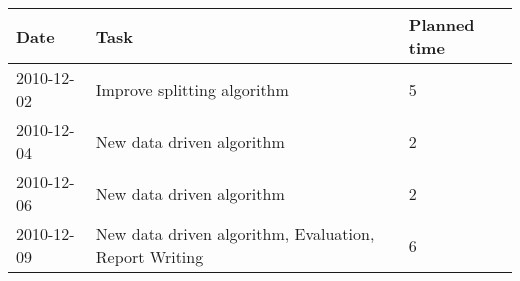 \documentclass[11pt, accentcolor=tud9b, nochapname]{tudexercise}
\begin{document}
\vspace{10pt}
\begin{tabular}{l | l | l}
  \hline
  \textbf{Date} & \textbf{Task} & \textbf{Planned time} \\ \hline
  2010-12-02 & Improve splitting algorithm & 5 \\ \hline
  2010-12-04 & New data driven algorithm & 2 \\ \hline
  2010-12-06 & New data driven algorithm & 2 \\ \hline
  2010-12-09 & New data driven algorithm, Evaluation, Report Writing & 6 \\ \hline
\end{tabular}
\end{document}
